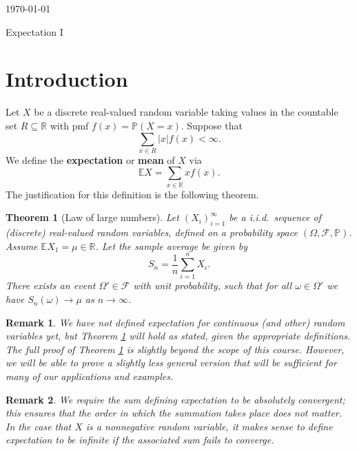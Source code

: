 \documentclass[12pt, reqno]{amsart}
\newtheorem{theorem}{Theorem}
\newtheorem{remark}{Remark}
\newcommand\dff[1]{\textbf{#1}}
\renewcommand{\P}{{\mathbb P}}  %
\newcommand{\R}{{\mathbb R}}
\newcommand{\E}{{\mathbb E}}     %
\newcommand{\F}{{\mathcal F}}     %
\begin{document}
\today
\begin{title}
{Expectation I}
\end{title}
\maketitle{}

\begin{abstract}
We will define the expectation of a discrete random variable and prove basic properties.  
\end{abstract}


\section{Introduction}

Let $X$ be a discrete real-valued random variable taking values in the countable set $R \subseteq \R$ with pmf $f(x) = \P(X =x)$.  Suppose that 
$$\sum_{x \in R} |x| f(x) < \infty.$$
We define the \dff{expectation} or \dff{mean} of $X$ via
$$ \E X = \sum_{x \in \R}  xf(x). $$
The justification for this definition is the following theorem.
\begin{theorem}[Law of large numbers]
\label{LLN}
Let $(X_i)_{i=1} ^{\infty}$ be a i.i.d.\ sequence of (discrete) real-valued random variables, defined on a probability space $(\Omega, \F, \P)$.  Assume $\E X_1 = \mu \in \R$.  Let the sample average be given by 
$$S_n = \frac{1}{n} \sum_{i=1} ^{n} X_i.$$    There exists an event $\Omega' \in \F$ with unit probability, such that   for all $\omega \in \Omega'$ we have   $S_n(\omega) \to \mu $  as $n \to \infty$.   
\end{theorem}




\begin{remark}
We have not defined expectation for continuous (and other) random variables yet, but Theorem \ref{LLN} will hold as stated,  given the appropriate definitions.   The full proof of Theorem \ref{LLN} is slightly beyond the scope of this course.  However, we will be able to prove a slightly less general version that will be sufficient for many of our applications and examples.  
\end{remark}

\begin{remark}
We require the sum defining expectation to be absolutely convergent; this ensures that the order in which the summation takes place does not matter.  In the case that $X$ is a nonnegative random variable, it makes sense to define expectation to be infinite if the associated sum fails to converge.
\end{remark}
\end{document}
